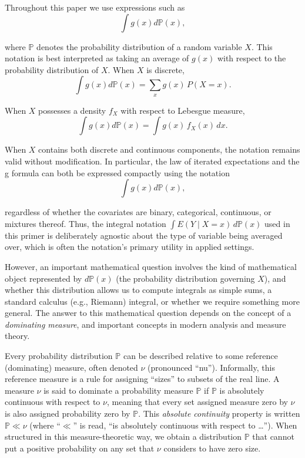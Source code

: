 \documentclass[12pt]{article}
\numberwithin{equation}{section}
\begin{document}
\noindent Throughout this paper we use expressions such as
$$\int g(x)d\mathbb{P}(x),$$

\noindent where $\mathbb{P}$ denotes the probability distribution of a random variable $X$. This notation is best interpreted as taking an average of $g(x)$ with respect to the probability distribution of $X$. When $X$ is discrete,
$$\int g(x)d\mathbb{P}(x) = \sum_x g(x)\,P(X=x).$$

\noindent When $X$ possesses a density $f_X$ with respect to Lebesgue measure,
$$\int g(x)d\mathbb{P}(x) = \int g(x)\,f_X(x)\,dx.$$

\noindent When $X$ contains both discrete and continuous components, the notation remains valid without modification. In particular, the law of iterated expectations and the g formula can both be expressed compactly using the notation
$$\int g(x)d\mathbb{P}(x),$$

\noindent regardless of whether the covariates are binary, categorical, continuous, or mixtures thereof. Thus, the integral notation $\int E(Y \mid X=x)\,d\mathbb{P}(x)$ used in this primer is deliberately agnostic about the type of variable being averaged over, which is often the notation's primary utility in applied settings. 

However, an important mathematical question involves the kind of mathematical object represented by $d\mathbb{P}(x)$ (the probability distribution governing $X$), and whether this distribution allows us to compute integrals as simple sums, a standard calculus (e.g., Riemann) integral, or whether we require something more general. The answer to this mathematical question depends on the concept of a \emph{dominating measure}, and important concepts in modern analysis and measure theory. 

Every probability distribution $\mathbb{P}$ can be described relative to some reference (dominating) measure, often denoted $\nu$ (pronounced ``nu''). Informally, this reference measure is a rule for assigning ``sizes'' to subsets of the real line. A measure $\nu$ is said to dominate a probability measure $\mathbb{P}$ if $\mathbb{P}$ is absolutely continuous with respect to $\nu$, meaning that every set assigned measure zero by $\nu$ is also assigned probability zero by $\mathbb{P}$. This \emph{absolute continuity} property is written $\mathbb{P} \ll \nu$ (where ``$\ll$'' is read, ``is absolutely continuous with respect to \ldots''). When structured in this measure-theoretic way, we obtain a distribution $\mathbb{P}$ that cannot put a positive probability on any set that $\nu$ considers to have zero size. 
  
\end{document}
